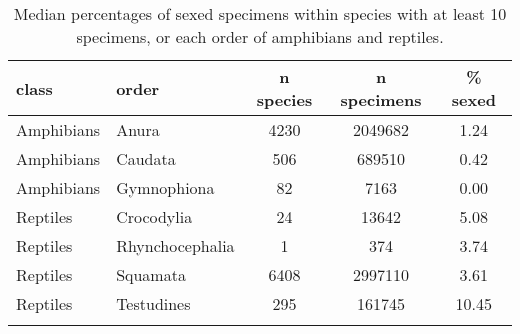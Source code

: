 \begin{longtable}{llccc}
\caption{Median percentages of sexed specimens within species with at least 
                   10 specimens, or each order of amphibians and reptiles.} \\ 
  \hline
class & order & n species & n specimens & \% sexed \\ 
  \hline
Amphibians & Anura & 4230 & 2049682 & 1.24 \\ 
  Amphibians & Caudata & 506 & 689510 & 0.42 \\ 
  Amphibians & Gymnophiona &  82 & 7163 & 0.00 \\ 
  Reptiles & Crocodylia &  24 & 13642 & 5.08 \\ 
  Reptiles & Rhynchocephalia &   1 & 374 & 3.74 \\ 
  Reptiles & Squamata & 6408 & 2997110 & 3.61 \\ 
  Reptiles & Testudines & 295 & 161745 & 10.45 \\ 
   \hline
\label{table-orders}
\end{longtable}
